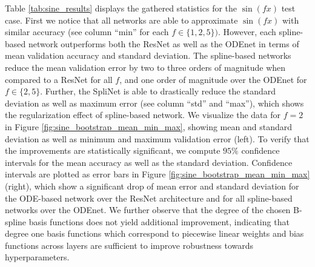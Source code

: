 \documentclass[12pt]{amsart}
\begin{document}
Table \ref{tab:sine_results} displays the gathered statistics for the $\sin(fx)$ test case. First we notice that all networks are able to approximate $\sin(fx)$ with similar accuracy (see column ``min'' for each $f\in \{1,2,5\})$. However, each spline-based network outperforms both the ResNet as well as the ODEnet in terms of mean validation accuracy and standard deviation.
The spline-based networks reduce the mean validation error by two to three orders of magnitude when compared to a ResNet for all $f$, and one order of magnitude over the ODEnet for $f\in\{2,5\}$. Further, the SpliNet is able to drastically reduce the standard deviation as well as maximum error (see column ``std'' and ``max''), which shows the regularization effect of spline-based network.
We visualize the data for $f=2$ in Figure \ref{fig:sine_bootstrap_mean_min_max}, showing mean and standard deviation as well as minimum and maximum validation error (left). To verify that the improvements are statistically significant, we compute $95\%$ confidence intervals for the mean accuracy as well as the standard deviation. Confidence intervals are plotted as error bars in Figure \ref{fig:sine_bootstrap_mean_min_max} (right), which show a significant drop of mean error and standard deviation for the ODE-based network over the ResNet architecture and for all spline-based networks over the ODEnet.
We further observe that the degree of the chosen B-spline basis functions does not yield additional improvement, indicating that degree one basis functions which correspond to piecewise linear weights and bias functions across layers are sufficient to improve robustness towards hyperparameters.
\end{document}
